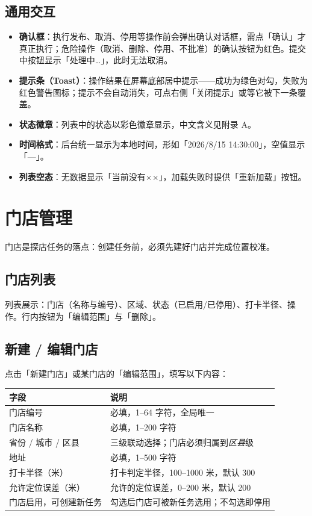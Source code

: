 \documentclass[12pt,a4paper,fontset=none]{ctexart}
\begin{document}
\subsection{通用交互}
\begin{itemize}
\item \textbf{确认框}：执行发布、取消、停用等操作前会弹出确认对话框，需点「确认」才真正执行；危险操作（取消、删除、停用、不批准）的确认按钮为红色。提交中按钮显示「处理中…」，此时无法取消。
\item \textbf{提示条（Toast）}：操作结果在屏幕底部居中提示——成功为绿色对勾，失败为红色警告图标；提示不会自动消失，可点右侧「关闭提示」或等它被下一条覆盖。
\item \textbf{状态徽章}：列表中的状态以彩色徽章显示，中文含义见附录 A。
\item \textbf{时间格式}：后台统一显示为本地时间，形如「2026/8/15 14:30:00」，空值显示「—」。
\item \textbf{列表空态}：无数据显示「当前没有××」，加载失败时提供「重新加载」按钮。
\end{itemize}

\section{门店管理}

门店是探店任务的落点：创建任务前，必须先建好门店并完成位置校准。

\subsection{门店列表}
列表展示：门店（名称与编号）、区域、状态（已启用/已停用）、打卡半径、操作。行内按钮为「编辑范围」与「删除」。

\subsection{新建 / 编辑门店}
点击「新建门店」或某门店的「编辑范围」，填写以下内容：

\begin{center}
\begin{tabular}{p{3.6cm}p{9.6cm}}
\toprule
字段 & 说明 \\
\midrule
门店编号 & 必填，1–64 字符，全局唯一 \\
门店名称 & 必填，1–200 字符 \\
省份 / 城市 / 区县 & 三级联动选择；门店必须归属到\emph{区县}级 \\
地址 & 必填，1–500 字符 \\
打卡半径（米） & 打卡判定半径，100–1000 米，默认 300 \\
允许定位误差（米） & 允许的定位误差，0–200 米，默认 200 \\
门店启用，可创建新任务 & 勾选后门店可被新任务选用；不勾选即停用 \\
\bottomrule
\end{tabular}
\end{center}
\end{document}
